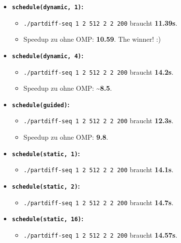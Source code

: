 \begin{itemize}
\itemsep1pt\parskip0pt
\item
  \textbf{\texttt{schedule(dynamic, 1)}:}

  \begin{itemize}
  \itemsep1pt\parskip0pt
  \item
    \texttt{./partdiff-seq 1 2 512 2 2 200} braucht \textbf{11.39s}.
  \item
    Speedup zu ohne OMP: \textbf{10.59}. The winner! :)
  \end{itemize}
\item
  \textbf{\texttt{schedule(dynamic, 4)}:}

  \begin{itemize}
  \itemsep1pt\parskip0pt
  \item
    \texttt{./partdiff-seq 1 2 512 2 2 200} braucht \textbf{14.2s}.
  \item
    Speedup zu ohne OMP: \textbf{\textasciitilde{}8.5}.
  \end{itemize}
\item
  \textbf{\texttt{schedule(guided)}:}

  \begin{itemize}
  \itemsep1pt\parskip0pt
  \item
    \texttt{./partdiff-seq 1 2 512 2 2 200} braucht \textbf{12.3s}.
  \item
    Speedup zu ohne OMP: \textbf{9.8}.
  \end{itemize}
\item
  \textbf{\texttt{schedule(static, 1)}:}

  \begin{itemize}
  \itemsep1pt\parskip0pt
  \item
    \texttt{./partdiff-seq 1 2 512 2 2 200} braucht \textbf{14.1s}.
  \end{itemize}
\item
  \textbf{\texttt{schedule(static, 2)}:}

  \begin{itemize}
  \itemsep1pt\parskip0pt
  \item
    \texttt{./partdiff-seq 1 2 512 2 2 200} braucht \textbf{14.7s}.
  \end{itemize}
\item
  \textbf{\texttt{schedule(static, 16)}:}

  \begin{itemize}
  \itemsep1pt\parskip0pt
  \item
    \texttt{./partdiff-seq 1 2 512 2 2 200} braucht \textbf{14.57s}.
  \end{itemize}
\end{itemize}

